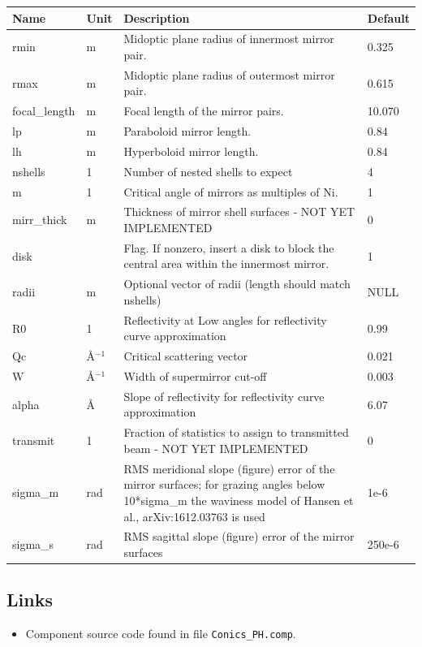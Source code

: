 \begin{longtable}{p{}p{}p{}p{}}
\toprule
\textbf{Name} & \textbf{Unit} & \textbf{Description} & \textbf{Default} \\
\midrule
\endhead
rmin & m & Midoptic plane radius of innermost mirror pair. & 0.325 \\
rmax & m & Midoptic plane radius of outermost mirror pair. & 0.615 \\
focal\_length & m & Focal length of the mirror pairs. & 10.070 \\
lp & m & Paraboloid mirror length. & 0.84 \\
lh & m & Hyperboloid mirror length. & 0.84 \\
nshells & 1 & Number of nested shells to expect & 4 \\
m & 1 & Critical angle of mirrors as multiples of Ni. & 1 \\
mirr\_thick & m & Thickness of mirror shell surfaces - NOT YET IMPLEMENTED & 0 \\
disk &   & Flag. If nonzero, insert a disk to block the central area within the innermost mirror. & 1 \\
radii & m & Optional vector of radii (length should match nshells) & NULL \\
R0 & 1 & Reflectivity at Low angles for reflectivity curve approximation & 0.99 \\
Qc & \AA{}$^{-1}$ & Critical scattering vector & 0.021 \\
W & \AA{}$^{-1}$ & Width of supermirror cut-off & 0.003 \\
alpha & \AA{} & Slope of reflectivity for reflectivity curve approximation & 6.07 \\
transmit & 1 & Fraction of statistics to assign to transmitted beam - NOT YET IMPLEMENTED & 0 \\
sigma\_m & rad & RMS meridional slope (figure) error of the mirror surfaces; for grazing angles below 10*sigma\_m the waviness model of Hansen et al., arXiv:1612.03763 is used & 1e-6 \\
sigma\_s & rad & RMS sagittal slope (figure) error of the mirror surfaces & 250e-6 \\
\bottomrule
\end{longtable}

\subsection*{Links}
\begin{itemize}
  \item Component source code found in file \texttt{Conics\_PH.comp}.
\end{itemize}
